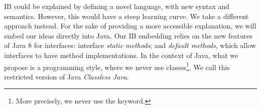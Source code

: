IB could be explained by defining a novel language, with new syntax
and semantics. However, this would have a steep learning curve.  We
take a different approach instead. For the sake of providing a more
accessible explanation, we will embed our ideas directly into Java. 
Our IB embedding relies on the
new features of Java 8 for interfaces: interface \emph{static methods}; and
\emph{default methods}, which allow interfaces to have method
implementations. In the context of Java, what we propose is a programming
style, where we never use classes\footnote{More precisely, we never
  use the \Q@class@ keyword.}.  We call this restricted version of
Java \emph{Classless Java}. 


%
%
%
%


